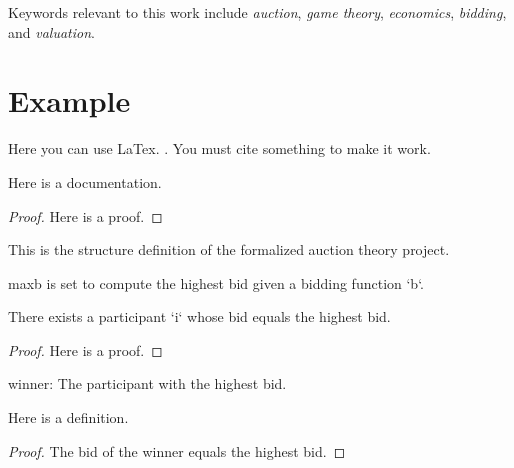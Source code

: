 Keywords relevant to this work include \textit{auction}, \textit{game theory}, \textit{economics}, \textit{bidding}, and \textit{valuation}.



\section{Example}
Here you can use LaTex. \cite{marcus}. You must cite something to make it work.

\begin{lemma}\label{two_different_elements}
    \leanok
    Here is a documentation.
\end{lemma}

\begin{proof}
    Here is a proof.
\end{proof}

\begin{definition}\label{Auction}
    \leanok
    This is the structure definition of the formalized auction theory project.
\end{definition}

\begin{definition}\label{maxb}
    \leanok
    maxb is set to compute the highest bid given a bidding function `b`.
\end{definition}

\begin{lemma}\label{exists_max}
    \leanok
    There exists a participant `i` whose bid equals the highest bid.
\end{lemma}
\begin{proof}
    Here is a proof.
\end{proof}


\begin{definition}\label{winner}
    \leanok
    winner: The participant with the highest bid.
\end{definition}

\begin{lemma}\label{winner_take_max}
    \leanok
    Here is a definition.
\end{lemma}
\begin{proof}
    The bid of the winner equals the highest bid.
\end{proof}

